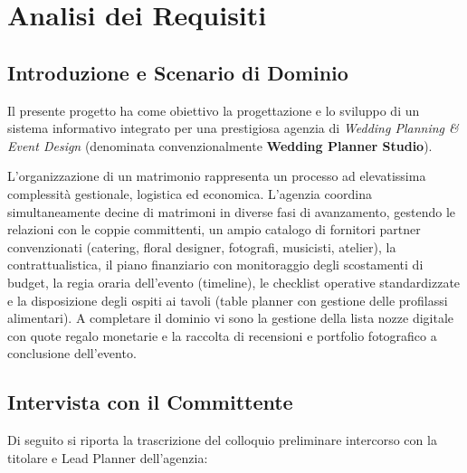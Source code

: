 \chapter{Analisi dei Requisiti}

\section{Introduzione e Scenario di Dominio}
Il presente progetto ha come obiettivo la progettazione e lo sviluppo di un sistema informativo integrato per una prestigiosa agenzia di \textit{Wedding Planning \& Event Design} (denominata convenzionalmente \textbf{Wedding Planner Studio}). 

L'organizzazione di un matrimonio rappresenta un processo ad elevatissima complessità gestionale, logistica ed economica. L'agenzia coordina simultaneamente decine di matrimoni in diverse fasi di avanzamento, gestendo le relazioni con le coppie committenti, un ampio catalogo di fornitori partner convenzionati (catering, floral designer, fotografi, musicisti, atelier), la contrattualistica, il piano finanziario con monitoraggio degli scostamenti di budget, la regia oraria dell'evento (timeline), le checklist operative standardizzate e la disposizione degli ospiti ai tavoli (table planner con gestione delle profilassi alimentari). A completare il dominio vi sono la gestione della lista nozze digitale con quote regalo monetarie e la raccolta di recensioni e portfolio fotografico a conclusione dell'evento.

\section{Intervista con il Committente}
Di seguito si riporta la trascrizione del colloquio preliminare intercorso con la titolare e Lead Planner dell'agenzia:

